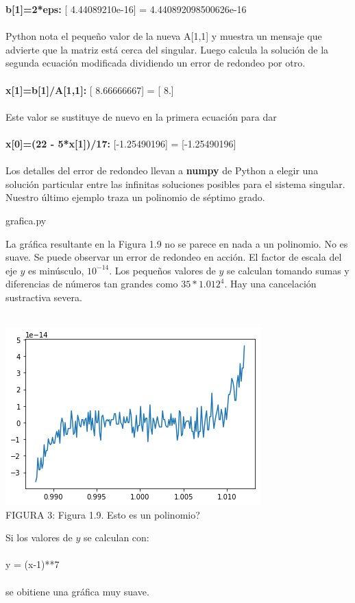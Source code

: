 \documentclass[12pt]{article}
\begin{document}
\textbf{b[1]=2*eps:} [  4.44089210e-16] = 4.440892098500626e-16\\\\
Python nota el pequeño valor de la nueva A[1,1] y muestra un mensaje que advierte que la
matriz está cerca del singular. Luego calcula la solución de la segunda ecuación modificada
dividiendo un error de redondeo por otro.\\\\
\textbf{x[1]=b[1]/A[1,1]:} [ 8.66666667] = [ 8.]\\\\
Este valor se sustituye de nuevo en la primera ecuación para dar\\\\
\textbf{x[0]=(22 - 5*x[1])/17:} [-1.25490196] = [-1.25490196]\\\\
Los detalles del error de redondeo llevan a \textbf{numpy} de Python a elegir una solución particular entre las
infinitas soluciones posibles para el sistema singular. Nuestro último ejemplo traza un
polinomio de séptimo grado.
\begin{center}

{grafica.py}
\end{center}
La gráfica resultante en la Figura 1.9 no se parece en nada a un polinomio. No es suave. Se puede observar un error de redondeo en acción. El factor de escala del eje $y$ es minúsculo, $10^{-14}$.
Los pequeños valores de $y$ se calculan tomando sumas y diferencias de números tan
grandes como $35*1.012^4$. Hay una cancelación sustractiva severa.\\\\
\begin{center}
  \includegraphics[scale=1]{grafica}\\
  FIGURA 3: Figura 1.9. Esto es un polinomio?\\
\end{center}
Si los valores de $y$ se calculan con:\\\\
y = (x-1)**7\\\\
se obitiene una gr\'afica muy suave.
\end{document}
